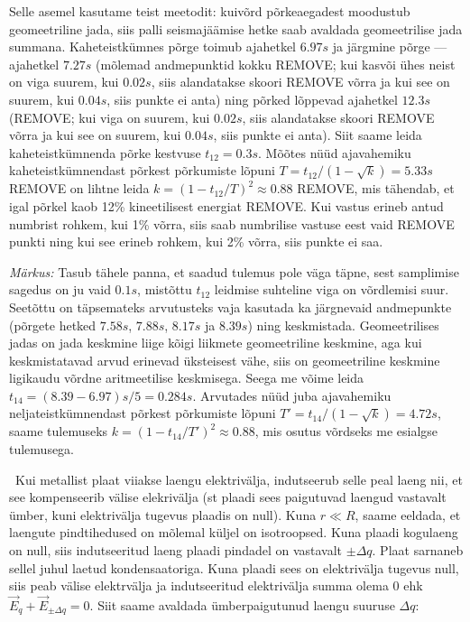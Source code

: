 \documentclass[10pt]{article}
\newcommand{\p}[1]{REMOVE}
\begin{document}
Selle asemel kasutame teist meetodit: kuivõrd põrkeaegadest moodustub geomeetriline jada, siis palli seismajäämise hetke saab avaldada geomeetrilise jada summana. Kaheteistkümnes põrge toimub ajahetkel $\SI{6.97}s$ ja järgmine põrge --- ajahetkel $\SI{7.27}s$ (mõlemad andmepunktid kokku \p1; kui kasvõi ühes neist on viga suurem, kui $\SI {0.02}s$, siis alandatakse skoori \p{0,5} võrra ja kui see on suurem, kui $\SI {0.04}s$, siis punkte ei anta) ning põrked lõppevad ajahetkel $\SI{12.3}s$ (\p1; kui viga on suurem, kui $\SI {0.02}s$, siis alandatakse skoori \p{0,5} võrra ja kui see on suurem, kui $\SI {0.04}s$, siis punkte ei anta). Siit saame leida kaheteistkümnenda põrke kestvuse $t_{12}=\SI{0.3}s$.
Mõõtes nüüd ajavahemiku kaheteistkümnendast põrkest põrkumiste lõpuni $T=t_{12}/(1-\sqrt k)=\SI{5.33}s$ \p1 on lihtne leida $k=(1-t_{12}/T)^2\approx 0.88$ \p1, mis tähendab, et igal põrkel kaob 12\% kineetilisest energiat \p1. Kui vastus erineb antud numbrist rohkem, kui 1\% võrra, siis saab numbrilise vastuse eest vaid \p{0,5} punkti ning kui see erineb rohkem, kui 2\% võrra, siis punkte ei saa.

\emph{Märkus:} Tasub tähele panna, et saadud tulemus pole väga täpne, sest samplimise sagedus on ju vaid $\SI{0.1}s$, mistõttu $t_{12}$ leidmise suhteline viga on võrdlemisi suur. Seetõttu on täpsemateks arvutusteks vaja kasutada ka järgnevaid andmepunkte (põrgete hetked $\SI{7.58}s$, $\SI{7.88}s$, $\SI{8.17}s$ ja $\SI{8.39}s$) ning keskmistada. Geomeetrilises jadas on jada keskmine liige kõigi liikmete geomeetriline keskmine, aga kui keskmistatavad arvud erinevad üksteisest vähe, siis on geomeetriline keskmine ligikaudu võrdne aritmeetilise keskmisega. Seega me võime leida $t_{14}=(\num{8.39}-\num{6.97})\unit{s}/5= \SI{0.284}s$. Arvutades nüüd juba ajavahemiku neljateistkümnendast põrkest põrkumiste lõpuni $T'=t_{14}/(1-\sqrt k)=\SI{4.72}s$, saame tulemuseks $k=(1-t_{14}/T')^2\approx 0.88$, mis osutus võrdseks me esialgse tulemusega.
\probend
\bigskip


\solu
\
Kui metallist plaat viiakse laengu elektrivälja, indutseerub selle peal laeng nii, et see kompenseerib välise elekrivälja (st plaadi sees paigutuvad laengud vastavalt ümber, kuni elektrivälja tugevus plaadis on null). Kuna $r \ll R$, saame eeldada, et laengute pindtihedused on mõlemal küljel on isotroopsed. Kuna plaadi kogulaeng on null, siis indutseeritud laeng plaadi pindadel on vastavalt $\pm \Delta q$. Plaat sarnaneb sellel juhul laetud kondensaatoriga. Kuna plaadi sees on elektrivälja tugevus null, siis peab välise elektrvälja ja indutseeritud elektrivälja summa olema $0$ ehk $\vec{E}_q + \vec{E}_{\pm \Delta q}=0$. Siit saame avaldada ümberpaigutunud laengu suuruse $\Delta q$:
\end{document}
